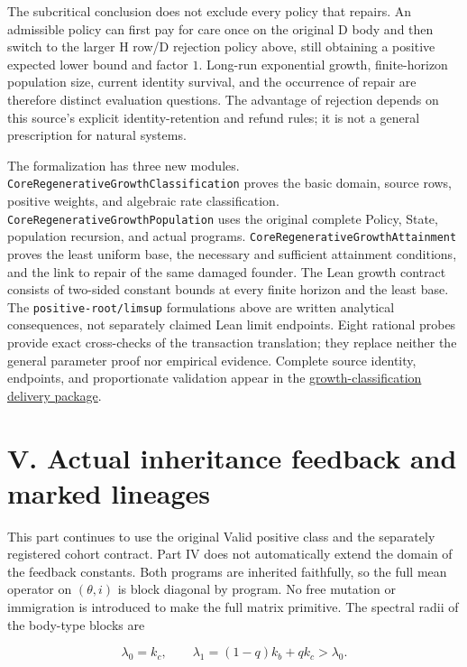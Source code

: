 \documentclass[
  english,
  11pt,
  oneside]{book}
\begin{document}
The subcritical conclusion does not exclude every policy that repairs. An admissible policy can first pay for care once on the original D body and then switch to the larger H row/D rejection policy above, still obtaining a positive expected lower bound and factor \(1\). Long-run exponential growth, finite-horizon population size, current identity survival, and the occurrence of repair are therefore distinct evaluation questions. The advantage of rejection depends on this source's explicit identity-retention and refund rules; it is not a general prescription for natural systems.

The formalization has three new modules. \nolinkurl{CoreRegenerativeGrowthClassification} proves the basic domain, source rows, positive weights, and algebraic rate classification. \nolinkurl{CoreRegenerativeGrowthPopulation} uses the original complete Policy, State, population recursion, and actual programs. \nolinkurl{CoreRegenerativeGrowthAttainment} proves the least uniform base, the necessary and sufficient attainment conditions, and the link to repair of the same damaged founder. The Lean growth contract consists of two-sided constant bounds at every finite horizon and the least base. The \nolinkurl{positive-root/limsup} formulations above are written analytical consequences, not separately claimed Lean limit endpoints. Eight rational probes provide exact cross-checks of the transaction translation; they replace neither the general parameter proof nor empirical evidence. Complete source identity, endpoints, and proportionate validation appear in the \href{../formalization/ueot-core/docs/compression/theory_completion/unified_closure/core_growth_classification_v1/README.md}{growth-classification delivery package}.

\section{V. Actual inheritance feedback and marked lineages}\label{v.-actual-inheritance-feedback-and-marked-lineages}

This part continues to use the original Valid positive class and the separately registered cohort contract. Part IV does not automatically extend the domain of the feedback constants. Both programs are inherited faithfully, so the full mean operator on \((\theta,i)\) is block diagonal by program. No free mutation or immigration is introduced to make the full matrix primitive. The spectral radii of the body-type blocks are

\[\lambda_0=k_c,\qquad \lambda_1=(1-q)k_b+qk_c>\lambda_0.\]
\end{document}
